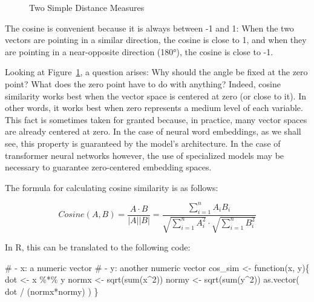 \documentclass[
  man,
  floatsintext,
  longtable,
  nolmodern,
  notxfonts,
  notimes,
  colorlinks=true,linkcolor=blue,citecolor=blue,urlcolor=blue]{apa7}
\newenvironment{Shaded}{\begin{snugshade}}{\end{snugshade}}
\newcommand{\CommentTok}[1]{\textcolor[rgb]{0.37,0.37,0.37}{#1}}
\newcommand{\ControlFlowTok}[1]{\textcolor[rgb]{0.00,0.23,0.31}{#1}}
\newcommand{\DecValTok}[1]{\textcolor[rgb]{0.68,0.00,0.00}{#1}}
\newcommand{\FunctionTok}[1]{\textcolor[rgb]{0.28,0.35,0.67}{#1}}
\newcommand{\NormalTok}[1]{\textcolor[rgb]{0.00,0.23,0.31}{#1}}
\newcommand{\OtherTok}[1]{\textcolor[rgb]{0.00,0.23,0.31}{#1}}
\newcommand{\SpecialCharTok}[1]{\textcolor[rgb]{0.37,0.37,0.37}{#1}}
\begin{document}
\begin{figure}

\caption{\label{fig-distmeasures}Two Simple Distance Measures}


\end{figure}%

The cosine is convenient because it is always between -1 and 1: When the
two vectors are pointing in a similar direction, the cosine is close to
1, and when they are pointing in a near-opposite direction (180°), the
cosine is close to -1.

Looking at Figure~\ref{fig-distmeasures}, a question arises: Why should
the angle be fixed at the zero point? What does the zero point have to
do with anything? Indeed, cosine similarity works best when the vector
space is centered at zero (or close to it). In other words, it works
best when zero represents a medium level of each variable. This fact is
sometimes taken for granted because, in practice, many vector spaces are
already centered at zero. In the case of neural word embeddings, as we
shall see, this property is guaranteed by the model's architecture. In
the case of transformer neural networks however, the use of specialized
models may be necessary to guarantee zero-centered embedding spaces.

The formula for calculating cosine similarity is as follows:

\[
Cosine(A,B) = \frac{A \cdot B}{|A||B|} = \frac{\sum _{i=1}^{n}  A_{i}B_{i}}{\sqrt {\sum _{i=1}^{n} A_{i}^2} \cdot \sqrt {\sum _{i=1}^{n} B_{i}^2}}
\]

In R, this can be translated to the following code:

\begin{Shaded}
\begin{Highlighting}[]
\CommentTok{\#  {-} \textasciigrave{}x\textasciigrave{}: a numeric vector}
\CommentTok{\#  {-} \textasciigrave{}y\textasciigrave{}: another numeric vector}
\NormalTok{cos\_sim }\OtherTok{\textless{}{-}} \ControlFlowTok{function}\NormalTok{(x, y)\{}
\NormalTok{  dot }\OtherTok{\textless{}{-}}\NormalTok{ x }\SpecialCharTok{\%*\%}\NormalTok{ y}
\NormalTok{  normx }\OtherTok{\textless{}{-}} \FunctionTok{sqrt}\NormalTok{(}\FunctionTok{sum}\NormalTok{(x}\SpecialCharTok{\^{}}\DecValTok{2}\NormalTok{))}
\NormalTok{  normy }\OtherTok{\textless{}{-}} \FunctionTok{sqrt}\NormalTok{(}\FunctionTok{sum}\NormalTok{(y}\SpecialCharTok{\^{}}\DecValTok{2}\NormalTok{))}
  \FunctionTok{as.vector}\NormalTok{( dot }\SpecialCharTok{/}\NormalTok{ (normx}\SpecialCharTok{*}\NormalTok{normy) )}
\NormalTok{\}}
\end{Highlighting}
\end{Shaded}
\end{document}
